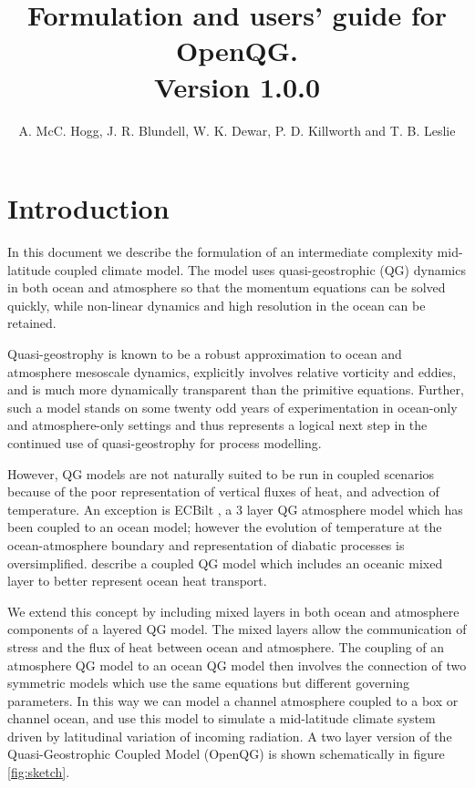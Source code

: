 \documentclass[11pt, a4paper,twoside]{article}
\numberwithin{equation}{section}
\begin{document}
\title{Formulation and users' guide for OpenQG.\\ Version 1.0.0}%
\author{A. McC. Hogg, J. R. Blundell, W. K. Dewar, P. D. Killworth and T. B. Leslie}

\maketitle

\begin{multicols}{2}
{\small \tableofcontents}
\end{multicols}

\newpage
\section{Introduction}
In this document we describe the formulation of an intermediate complexity mid-latitude coupled climate model.
The model uses quasi-geostrophic (QG) dynamics in both ocean and atmosphere so that the momentum equations can be solved quickly, while non-linear dynamics and high resolution in the ocean can be retained.

Quasi-geostrophy is known to be a robust approximation to ocean and atmosphere mesoscale dynamics, explicitly involves relative vorticity and eddies, and is much more dynamically transparent than the primitive equations.
Further, such a model stands on some twenty odd years of experimentation in ocean-only and atmosphere-only settings and thus represents a logical next step in the continued use of quasi-geostrophy for process modelling.

However, QG models are not naturally suited to be run in coupled scenarios because of the poor representation of vertical fluxes of heat, and advection of temperature.
An exception is ECBilt \citep{opsteegh:98}, a 3 layer QG atmosphere model which has been coupled to an ocean model; however the evolution of temperature at the ocean-atmosphere boundary and representation of diabatic processes is oversimplified.
\citet{kravtsov:02} describe a coupled QG model  which includes an oceanic mixed layer to better represent ocean heat transport.

We extend this concept by including mixed layers in both ocean and atmosphere components of a layered QG model.
The mixed layers allow the communication of stress and the flux of heat between ocean and atmosphere.
The coupling of an atmosphere QG model to an ocean QG model then involves the connection of two symmetric models which use the same equations but different governing parameters.
In this way we can model a channel atmosphere coupled to a box or channel ocean, and use this model to simulate a mid-latitude climate system driven by latitudinal variation of incoming radiation.
A two layer version of the Quasi-Geostrophic Coupled Model (OpenQG) is shown schematically in figure \ref{fig:sketch}.
\end{document}
